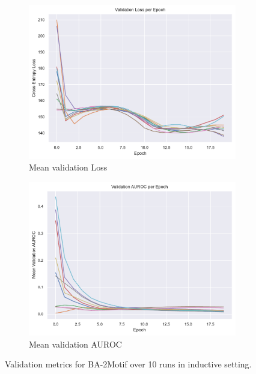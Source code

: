 \begin{figure}[htbp]
    \centering
    \begin{subfigure}[b]{0.48\textwidth}
        \centering
        \includegraphics[width=\textwidth]{img/plots/2M_val_loss_plot_NO_LEGEND.pdf}
        \caption{Mean validation Loss}
        \label{fig:BA-2Motif-val_loss}
    \end{subfigure}
    \hfill
    \begin{subfigure}[b]{0.48\textwidth}
        \centering
        \includegraphics[width=\textwidth]{img/plots/2M_val_auroc_plot_NO_LEGEND.pdf}
        \caption{Mean validation AUROC}
        \label{fig:BA-2Motif-val_auroc}
    \end{subfigure}
    \caption[Validation metrics for BA-2Motif]{Validation metrics for BA-2Motif over 10 runs in inductive setting.}
    \label{fig:BA-2Motif-val_metrics}
\end{figure}

